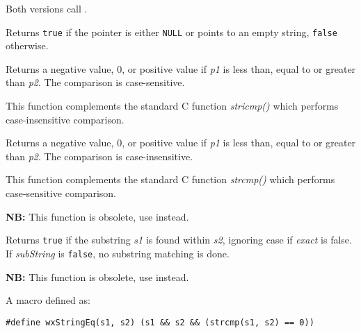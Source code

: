 Both versions call .

\label{wxisempty}


Returns {\tt true} if the pointer is either {\tt NULL} or points to an empty
string, {\tt false} otherwise.


\label{wxstrcmp}


Returns a negative value, 0, or positive value if {\it p1} is less than, equal
to or greater than {\it p2}. The comparison is case-sensitive.

This function complements the standard C function {\it stricmp()} which performs
case-insensitive comparison.


\label{wxstricmp}


Returns a negative value, 0, or positive value if {\it p1} is less than, equal
to or greater than {\it p2}. The comparison is case-insensitive.

This function complements the standard C function {\it strcmp()} which performs
case-sensitive comparison.


\label{wxstringmatch}


{\bf NB:} This function is obsolete, use  instead.

Returns {\tt true} if the substring {\it s1} is found within {\it s2},
ignoring case if {\it exact} is false. If {\it subString} is {\tt false},
no substring matching is done.


\label{wxstringeq}


{\bf NB:} This function is obsolete, use  instead.

A macro defined as:

\begin{verbatim}
#define wxStringEq(s1, s2) (s1 && s2 && (strcmp(s1, s2) == 0))
\end{verbatim}


